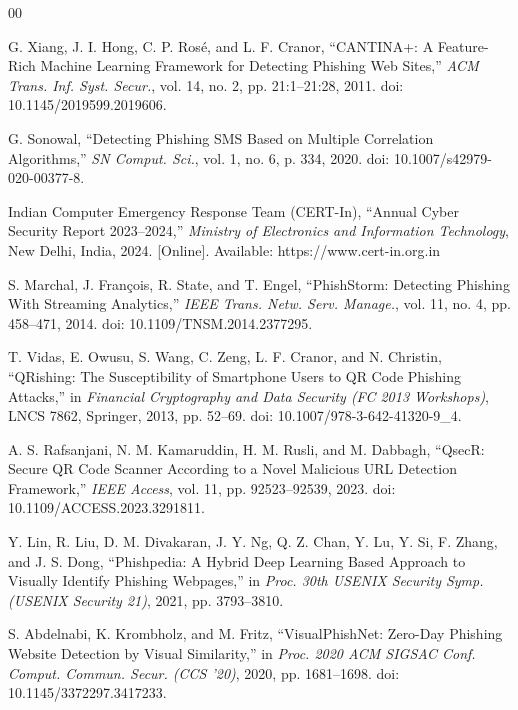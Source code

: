 \documentclass[conference]{IEEEtran}
\begin{document}
\begin{thebibliography}{00}

G. Xiang, J. I. Hong, C. P. Ros{\'e}, and L. F. Cranor, ``CANTINA+: A Feature-Rich Machine Learning Framework for Detecting Phishing Web Sites,'' \textit{ACM Trans. Inf. Syst. Secur.}, vol. 14, no. 2, pp. 21:1--21:28, 2011. doi: 10.1145/2019599.2019606.

G. Sonowal, ``Detecting Phishing SMS Based on Multiple Correlation Algorithms,'' \textit{SN Comput. Sci.}, vol. 1, no. 6, p. 334, 2020. doi: 10.1007/s42979-020-00377-8.

Indian Computer Emergency Response Team (CERT-In), ``Annual Cyber Security Report 2023--2024,'' \textit{Ministry of Electronics and Information Technology}, New Delhi, India, 2024. [Online]. Available: https://www.cert-in.org.in

S. Marchal, J. Fran{\c{c}}ois, R. State, and T. Engel, ``PhishStorm: Detecting Phishing With Streaming Analytics,'' \textit{IEEE Trans. Netw. Serv. Manage.}, vol. 11, no. 4, pp. 458--471, 2014. doi: 10.1109/TNSM.2014.2377295.

T. Vidas, E. Owusu, S. Wang, C. Zeng, L. F. Cranor, and N. Christin, ``QRishing: The Susceptibility of Smartphone Users to QR Code Phishing Attacks,'' in \textit{Financial Cryptography and Data Security (FC 2013 Workshops)}, LNCS 7862, Springer, 2013, pp. 52--69. doi: 10.1007/978-3-642-41320-9\_4.

A. S. Rafsanjani, N. M. Kamaruddin, H. M. Rusli, and M. Dabbagh, ``QsecR: Secure QR Code Scanner According to a Novel Malicious URL Detection Framework,'' \textit{IEEE Access}, vol. 11, pp. 92523--92539, 2023. doi: 10.1109/ACCESS.2023.3291811.

Y. Lin, R. Liu, D. M. Divakaran, J. Y. Ng, Q. Z. Chan, Y. Lu, Y. Si, F. Zhang, and J. S. Dong, ``Phishpedia: A Hybrid Deep Learning Based Approach to Visually Identify Phishing Webpages,'' in \textit{Proc. 30th USENIX Security Symp. (USENIX Security 21)}, 2021, pp. 3793--3810.

S. Abdelnabi, K. Krombholz, and M. Fritz, ``VisualPhishNet: Zero-Day Phishing Website Detection by Visual Similarity,'' in \textit{Proc. 2020 ACM SIGSAC Conf. Comput. Commun. Secur. (CCS '20)}, 2020, pp. 1681--1698. doi: 10.1145/3372297.3417233.


\end{thebibliography}
\end{document}
